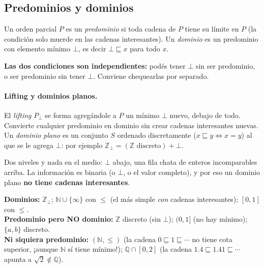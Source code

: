 \subsection*{Predominios y dominios}
\begin{definition}
Un orden parcial $P$ es un \emph{predominio} si toda cadena de $P$ tiene su
límite en $P$ (la condición solo muerde en las cadenas interesantes). Un
\emph{dominio} es un predominio con elemento mínimo $\bot$, es decir
$\bot \sqsubseteq x$ para todo $x$.
\end{definition}

\noindent\textbf{Las dos condiciones son independientes:} podés tener $\bot$ sin ser
predominio, o ser predominio sin tener $\bot$. Conviene chequearlas por separado.

\paragraph{Lifting y dominios planos.}
El \emph{lifting} $P_\bot$ se forma agregándole a $P$ un mínimo $\bot$ nuevo, debajo
de todo. Convierte cualquier predominio en dominio sin crear cadenas interesantes
nuevas. Un \emph{dominio plano} es un conjunto $S$ ordenado discretamente
($x \sqsubseteq y \iff x=y$) al que se le agrega $\bot$: por ejemplo
$\mathbb{Z}_\bot = (\mathbb{Z}\text{ discreto}) + \bot$.
\begin{center}
\end{center}
Dos niveles y nada en el medio: $\bot$ abajo, una fila chata de enteros
incomparables arriba. La información es binaria (o $\bot$, o el valor completo), y
por eso un dominio plano \textbf{no tiene cadenas interesantes}.

\begin{example}[Zoológico]
\textbf{Dominios:} $\mathbb{Z}_\bot$; $\mathbb{N}\cup\{\infty\}$ con $\le$ (el más
simple \emph{con} cadenas interesantes); $[0,1]$ con $\le$.\\
\textbf{Predominio pero NO dominio:} $\mathbb{Z}$ discreto (sin $\bot$);
$(0,1]$ (no hay mínimo); $\{a,b\}$ discreto.\\
\textbf{Ni siquiera predominio:} $(\mathbb{N},\le)$ (la cadena $0\sqsubseteq 1\sqsubseteq\cdots$
no tiene cota superior, ¡aunque $\mathbb{N}$ sí tiene mínimo!);
$\mathbb{Q}\cap[0,2]$ (la cadena $1.4 \sqsubseteq 1.41 \sqsubseteq \cdots$ apunta a $\sqrt 2 \notin \mathbb{Q}$).
\end{example}

